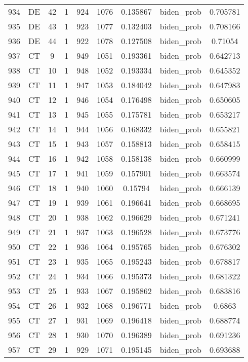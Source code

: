 \documentclass[12pt,a4paper]{article}
\begin{document}
\begin{tabular}{r|cccccccc}
	934 & DE & 42 & 1 & 924 & 1076 & 0.135867 & biden\_prob & 0.705781 \\
	935 & DE & 43 & 1 & 923 & 1077 & 0.132403 & biden\_prob & 0.708166 \\
	936 & DE & 44 & 1 & 922 & 1078 & 0.127508 & biden\_prob & 0.71054 \\
	937 & CT & 9 & 1 & 949 & 1051 & 0.193361 & biden\_prob & 0.642713 \\
	938 & CT & 10 & 1 & 948 & 1052 & 0.193334 & biden\_prob & 0.645352 \\
	939 & CT & 11 & 1 & 947 & 1053 & 0.184042 & biden\_prob & 0.647983 \\
	940 & CT & 12 & 1 & 946 & 1054 & 0.176498 & biden\_prob & 0.650605 \\
	941 & CT & 13 & 1 & 945 & 1055 & 0.175781 & biden\_prob & 0.653217 \\
	942 & CT & 14 & 1 & 944 & 1056 & 0.168332 & biden\_prob & 0.655821 \\
	943 & CT & 15 & 1 & 943 & 1057 & 0.158813 & biden\_prob & 0.658415 \\
	944 & CT & 16 & 1 & 942 & 1058 & 0.158138 & biden\_prob & 0.660999 \\
	945 & CT & 17 & 1 & 941 & 1059 & 0.157901 & biden\_prob & 0.663574 \\
	946 & CT & 18 & 1 & 940 & 1060 & 0.15794 & biden\_prob & 0.666139 \\
	947 & CT & 19 & 1 & 939 & 1061 & 0.196641 & biden\_prob & 0.668695 \\
	948 & CT & 20 & 1 & 938 & 1062 & 0.196629 & biden\_prob & 0.671241 \\
	949 & CT & 21 & 1 & 937 & 1063 & 0.196528 & biden\_prob & 0.673776 \\
	950 & CT & 22 & 1 & 936 & 1064 & 0.195765 & biden\_prob & 0.676302 \\
	951 & CT & 23 & 1 & 935 & 1065 & 0.195243 & biden\_prob & 0.678817 \\
	952 & CT & 24 & 1 & 934 & 1066 & 0.195373 & biden\_prob & 0.681322 \\
	953 & CT & 25 & 1 & 933 & 1067 & 0.195862 & biden\_prob & 0.683816 \\
	954 & CT & 26 & 1 & 932 & 1068 & 0.196771 & biden\_prob & 0.6863 \\
	955 & CT & 27 & 1 & 931 & 1069 & 0.196418 & biden\_prob & 0.688774 \\
	956 & CT & 28 & 1 & 930 & 1070 & 0.196389 & biden\_prob & 0.691236 \\
	957 & CT & 29 & 1 & 929 & 1071 & 0.195145 & biden\_prob & 0.693688 \\

\end{tabular}
\end{document}
